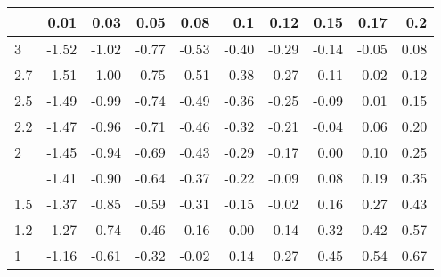 
\begin{tabular}{lrrrrrrrrr}
\toprule
  & 0.01 & 0.03 & 0.05 & 0.08 & 0.1 & 0.12 & 0.15 & 0.17 & 0.2\\
\midrule
3 & -1.52 & -1.02 & -0.77 & -0.53 & -0.40 & -0.29 & -0.14 & -0.05 & 0.08\\
2.7 & -1.51 & -1.00 & -0.75 & -0.51 & -0.38 & -0.27 & -0.11 & -0.02 & 0.12\\
2.5 & -1.49 & -0.99 & -0.74 & -0.49 & -0.36 & -0.25 & -0.09 & 0.01 & 0.15\\
2.2 & -1.47 & -0.96 & -0.71 & -0.46 & -0.32 & -0.21 & -0.04 & 0.06 & 0.20\\
2 & -1.45 & -0.94 & -0.69 & -0.43 & -0.29 & -0.17 & 0.00 & 0.10 & 0.25\\
\addlinespace
1.7 & -1.41 & -0.90 & -0.64 & -0.37 & -0.22 & -0.09 & 0.08 & 0.19 & 0.35\\
1.5 & -1.37 & -0.85 & -0.59 & -0.31 & -0.15 & -0.02 & 0.16 & 0.27 & 0.43\\
1.2 & -1.27 & -0.74 & -0.46 & -0.16 & 0.00 & 0.14 & 0.32 & 0.42 & 0.57\\
1 & -1.16 & -0.61 & -0.32 & -0.02 & 0.14 & 0.27 & 0.45 & 0.54 & 0.67\\
\bottomrule
\end{tabular}
